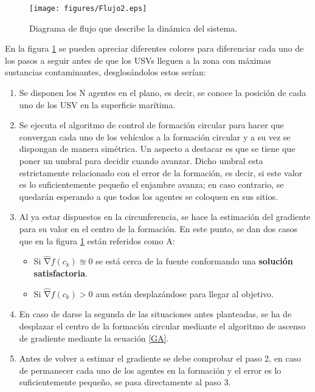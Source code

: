 \begin{figure}[htb]
\centering
\texttt{[image: figures/Flujo2.eps]}
\caption{Diagrama de flujo que describe la dinámica del sistema.} \label{fig:Flujo}
\end{figure}
\newpage
En la figura \ref{fig:Flujo} se pueden apreciar diferentes colores para diferenciar cada uno de los pasos a seguir antes de que los USVs lleguen a la zona con máximas sustancias contaminantes, desglosándolos estos serían:

\begin{enumerate}
	\item Se disponen los N agentes en el plano, es decir, se conoce la posición de cada uno de los USV en la superficie marítima.
	\item Se ejecuta el algoritmo de control de formación circular para hacer que convergan cada uno de los vehículos a la formación circular y a su vez se dispongan de manera simétrica. Un aspecto a destacar es que se tiene que poner un umbral para decidir cuando avanzar. Dicho umbral esta estrictamente relacionado con el error de la formación, es decir, si este valor es lo suficientemente pequeño el enjambre avanza; en caso contrario, se quedarán esperando a que todos los agentes se coloquen en sus sitios. 
	\item Al ya estar dispuestos en la circunferencia, se hace la estimación del gradiente para su valor en el centro de la formación. En este punto, se dan dos casos que en la figura \ref{fig:Flujo} están referidos como A:
	\begin{itemize}
		\item Si $\widehat{\mathrm{\nabla }}{f}\left(c_{k}\right)\approxeq0$ se está cerca de la fuente conformando una \textbf{solución satisfactoria}.
		\item Si $\widehat{\mathrm{\nabla }}{f}\left(c_{k}\right)>0$ aun están desplazándose para llegar al objetivo.
	\end{itemize}
	\item En caso de darse la segunda de las situaciones antes planteadas, se ha de desplazar el centro de la formación circular mediante el algoritmo de ascenso de gradiente mediante la ecuación \ref{GA}.
	\item Antes de volver a estimar el gradiente se debe comprobar el paso 2, en caso de permanecer cada uno de los agentes en la formación y el error es lo suficientemente pequeño, se pasa directamente al paso 3.
\end{enumerate}








